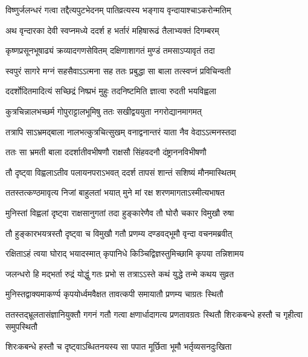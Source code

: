 


\twolineshloka
{विष्णुर्जलन्धरं गत्वा तद्दैत्यपुटभेदनम्}
{पातिव्रत्यस्य भङ्गाय वृन्दायाश्चाऽकरोन्मतिम्} %

\twolineshloka
{अथ वृन्दारका देवी स्वप्नमध्ये ददर्श ह}
{भर्तारं महिषारूढं तैलाभ्यक्तं दिगम्बरम्} %

\twolineshloka
{कृष्णप्रसूनभूषाढ्यं क्रव्यादगणसेवितम्}
{दक्षिणाशागतं मुण्डं तमसाऽप्यावृतं तदा} %

\twolineshloka
{स्वपुरं सागरे मग्नं सहसैवाऽऽत्मना सह}
{ततः प्रबुद्धा सा बाला तत्स्वप्नं प्रविचिन्वती} %

\twolineshloka
{ददर्शोदितमादित्यं सच्छिद्रं निष्प्रभं मुहुः}
{तदनिष्टमिति ज्ञात्वा रुदती भयविह्वला} %

\twolineshloka
{कुत्रचिन्नालभच्छर्म गोपुराट्टालभूमिषु}
{ततः सखीद्वययुता नगरोद्यानमागमत्} %

\twolineshloka
{तत्रापि साऽभ्रमद्बाला नालभत्कुत्रचित्सुखम्}
{वनाद्वनान्तरं याता नैव वेदाऽऽत्मनस्तदा} %

\twolineshloka
{ततः सा भ्रमती बाला ददर्शातीवभीषणौ}
{राक्षसौ सिंहवदनौ दंष्ट्राननविभीषणौ} %

\twolineshloka
{तौ दृष्ट्वा विह्वलाऽतीव पलायनपराऽभवत्}
{ददर्श तापसं शान्तं सशिष्यं मौनमास्थितम्} %

\twolineshloka
{ततस्तत्कण्ठमावृत्य निजां बाहुलतां भयात्}
{मुने मां रक्ष शरणमागताऽस्मीत्यभाषत} %

\twolineshloka
{मुनिस्तां विह्वलां दृष्ट्वा राक्षसानुगतां तदा}
{हुङ्कारेणैव तौ घोरौ चकार विमुखौ रुषा} %

\twolineshloka
{तौ हुङ्कारभयत्रस्तौ दृष्ट्वा च विमुखौ गतौ}
{प्रणम्य दण्डवद्भूमौ वृन्दा वचनमब्रवीत्} %


\twolineshloka
{रक्षिताऽहं त्वया घोराद् भयादस्मात् कृपानिधे}
{किञ्चिद्विज्ञस्तुमिच्छामि कृपया तन्निशामय} %

\twolineshloka
{जलन्धरो हि मद्भर्ता रुद्रं योद्धुं गतः प्रभो}
{स तत्राऽऽस्ते कथं युद्धे तन्मे कथय सुव्रत} %


\twolineshloka
{मुनिस्तद्वाक्यमाकर्ण्य कृपयोर्ध्वमवैक्षत}
{तावत्कपी समायातौ प्रणम्य चाग्रतः स्थितौ} %

\threelineshloka
{ततस्तद्भ्रूलतासंज्ञानियुक्तौ गगनं गतौ}
{गत्वा क्षणार्धादागत्य प्रणतावग्रतः स्थितौ}
{शिरःकबन्धे हस्तौ च गृहीत्वा समुपस्थितौ} %

\twolineshloka
{शिरःकबन्धे हस्तौ च दृष्ट्वाऽब्धितनयस्य सा}
{पपात मूर्छिता भूमौ भर्तृव्यसनदुःखिता} %

